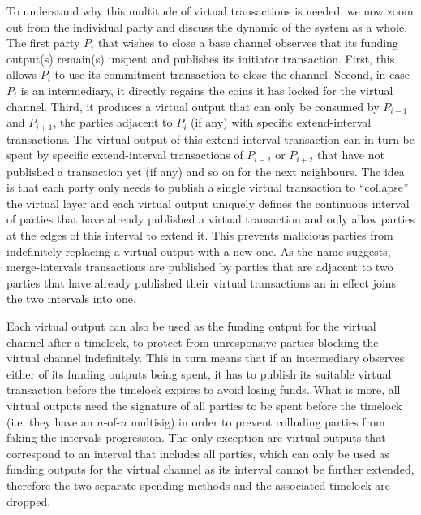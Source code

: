   To understand why this multitude of virtual transactions is needed, we now
  zoom out from the individual party and discuss the dynamic of the system as a
  whole. The first party $P_i$ that wishes to close a base channel observes that
  its funding output(s) remain(s) unspent and publishes its initiator
  transaction. First, this allows $P_i$ to use its commitment transaction to
  close the channel. Second, in case $P_i$ is an intermediary, it directly
  regains the coins it has locked for the virtual channel. Third, it produces a
  virtual output that can only be consumed by $P_{i-1}$ and $P_{i+1}$, the
  parties adjacent to $P_i$ (if any) with specific extend-interval transactions.
  The virtual output of this extend-interval transaction can in turn be spent by
  specific extend-interval transactions of $P_{i-2}$ or $P_{i+2}$ that have not
  published a transaction yet (if any) and so on for the next neighbours. The
  idea is that each party only needs to publish a single virtual transaction to
  ``collapse'' the virtual layer and each virtual output uniquely defines the
  continuous interval of parties that have already published a virtual
  transaction and only allow parties at the edges of this interval to extend it.
  This prevents malicious parties from indefinitely replacing a virtual output
  with a new one. As the name suggests, merge-intervals transactions are
  published by parties that are adjacent to two parties that have already
  published their virtual transactions an in effect joins the two intervals into
  one.

  Each virtual output can also be used as the funding output for the virtual
  channel after a timelock, to protect from unresponsive parties blocking the
  virtual channel indefinitely. This in turn means that if an intermediary
  observes either of its funding outputs being spent, it has to publish its
  suitable virtual transaction before the timelock expires to avoid losing
  funds. What is more, all virtual outputs need the signature of all parties to
  be spent before the timelock (i.e. they have an $n$-of-$n$ multisig) in order
  to prevent colluding parties from faking the intervals progression. The only
  exception are virtual outputs that correspond to an interval that includes all
  parties, which can only be used as funding outputs for the virtual channel as
  its interval cannot be further extended, therefore the two separate spending
  methods and the associated timelock are dropped.

